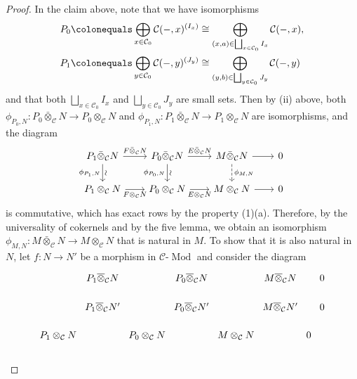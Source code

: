 \documentclass{surv-l}
\numberwithin{equation}{chapter}
\numberwithin{figure}{chapter}
\theoremstyle{plain}
\theoremstyle{definition}
\theoremstyle{remark}
\newcommand{\vsim}{\rotatebox{90}{$\sim$}}
\newcommand{\lMod}{\text{-}\!\Mod}
\newcommand{\Ar}[3]{\ar[from={#1}, to={#2}, #3]}
\DeclareMathOperator{\Mod}{Mod}
\DeclareMathOperator{\blank}{-}
\begin{document}
\begin{proof}
In the claim above, note that we have isomorphisms
\[
\begin{aligned}
P_0\colonequals  \bigoplus_{x \in {\mathcal{C}}_0}{\mathcal{C}}(\blank, x)^{(I_x)} &\cong \bigoplus_{(x,a) \in \bigsqcup_{x\in {\mathcal{C}}_0}I_x}{\mathcal{C}}(\blank, x),\\
P_1\colonequals  \bigoplus_{y \in {\mathcal{C}}_0}{\mathcal{C}}(\blank, y)^{(J_y)} &\cong \bigoplus_{(y,b) \in \bigsqcup_{y\in {\mathcal{C}}_0}J_y}{\mathcal{C}}(\blank, y)
\end{aligned}
\]
and that both $\bigsqcup_{x\in {\mathcal{C}}_0}I_x$ and $\bigsqcup_{y\in {\mathcal{C}}_0}J_y$ are small sets.
Then
by (ii) above, both
$\phi_{P_0,N}\colon P_0\bar{\otimes}_{\mathcal{C}} N \to P_0 \otimes_{\mathcal{C}} N$ and
$\phi_{P_1,N} \colon P_1\bar{\otimes}_{\mathcal{C}} N \to P_1 \otimes_{\mathcal{C}} N$ are isomorphisms, and
the diagram
\begin{equation}\label{eq:small-ph_M,N}
\begin{tikzcd}[column sep=2em]
P_1 \bar{\otimes}_{\mathcal{C}} N & P_0 \bar{\otimes}_{\mathcal{C}} N & M \bar{\otimes}_{\mathcal{C}} N & 0\\
P_1 \otimes_{\mathcal{C}} N & P_0 \otimes_{\mathcal{C}} N & M \otimes_{\mathcal{C}} N & 0
\Ar{1-1}{1-2}{"F\bar{\otimes}_{\mathcal{C}} N"}
\Ar{1-2}{1-3}{"E\bar{\otimes}_{\mathcal{C}} N"}
\Ar{1-3}{1-4}{}
\Ar{2-1}{2-2}{"F\otimes_{\mathcal{C}} N" '}
\Ar{2-2}{2-3}{"E\otimes_{\mathcal{C}} N" '}
\Ar{2-3}{2-4}{}
\Ar{1-1}{2-1}{"\vsim", "\phi_{P_1,N}" '}
\Ar{1-2}{2-2}{"\vsim", "\phi_{P_0,N}" '}
\Ar{1-3}{2-3}{"\phi_{M,N}", dashed}
\end{tikzcd}
\end{equation}
is commutative, which has exact rows by the property (1)(a).
Therefore, by the universality of cokernels and by the five lemma,
we obtain an isomorphism
$\phi_{M,N} \colon M\bar{\otimes}_{\mathcal{C}} N \to M \otimes_{\mathcal{C}} N$
that is natural in $M$.
To show that it is also natural in $N$, let $f \colon N \to N'$ be a morphism in
${\mathcal{C}}\lMod$ and consider the diagram
\[
\begin{tikzcd}[row sep=13pt, column sep=0pt]
&P_1 \overline{\otimes}_{\mathcal{C}} N &&P_0 \overline{\otimes}_{\mathcal{C}} N && M \overline{\otimes}_{\mathcal{C}} N &&0\\
&P_1 \overline{\otimes}_{\mathcal{C}} N' &&P_0 \overline{\otimes}_{\mathcal{C}} N' && M \overline{\otimes}_{\mathcal{C}} N' &&0\\
P_1\otimes_{\mathcal{C}} N && P_0 \otimes_{\mathcal{C}} N && M \otimes_{\mathcal{C}} N &&0\\

\end{tikzcd}\]
\end{proof}
\end{document}
